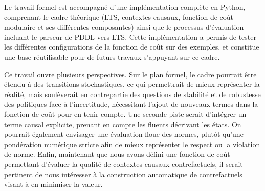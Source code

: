 Le travail formel est accompagné d'une implémentation complète en Python, comprenant le cadre théorique (LTS, contextes causaux, fonction de coût modulaire et ses différentes composantes) ainsi que le processus d'évaluation incluant le parseur de PDDL vers LTS. Cette implémentation a permis de tester les différentes configurations de la fonction de coût sur des exemples, et constitue une base réutilisable pour de futurs travaux s'appuyant sur ce cadre.


Ce travail ouvre plusieurs perspectives. Sur le plan formel, le cadre pourrait être étendu à des transitions stochastiques, ce qui permettrait de mieux représenter la réalité, mais soulèverait en contrepartie des questions de stabilité et de robustesse des politiques face à l'incertitude, nécessitant l'ajout de nouveaux termes dans la fonction de coût pour en tenir compte. Une seconde piste serait d'intégrer un terme causal explicite, prenant en compte les fluents décrivant les états. On pourrait également envisager une évaluation floue des normes, plutôt qu'une pondération numérique stricte afin de mieux représenter le respect ou la violation de norme. Enfin, maintenant que nous avons défini une fonction de coût permettant d'évaluer la qualité de contextes causaux contrefactuels, il serait pertinent de nous intéresser à la construction automatique de contrefactuels visant à en minimiser la valeur.
















        